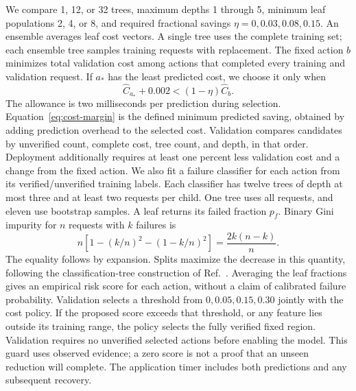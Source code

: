 We compare 1, 12, or 32 trees, maximum depths 1 through 5, minimum leaf populations 2, 4, or 8, and required fractional savings $\eta=0,0.03,0.08,0.15$. An ensemble averages leaf cost vectors. A single tree uses the complete training set; each ensemble tree samples training requests with replacement. The fixed action $b$ minimizes total validation cost among actions that completed every training and validation request. If $a_*$ has the least predicted cost, we choose it only when
\begin{equation}
 \widehat C_{a_*}+0.002 < (1-\eta)\widehat C_b.
 \label{eq:cost-margin}
\end{equation}
The allowance is two milliseconds per prediction during selection. Equation~\eqref{eq:cost-margin} is the defined minimum predicted saving, obtained by adding prediction overhead to the selected cost. Validation compares candidates by unverified count, complete cost, tree count, and depth, in that order. Deployment additionally requires at least one percent less validation cost and a change from the fixed action. We also fit a failure classifier for each action from its verified/unverified training labels. Each classifier has twelve trees of depth at most three and at least two requests per child. One tree uses all requests, and eleven use bootstrap samples. A leaf returns its failed fraction $p_f$. Binary Gini impurity for $n$ requests with $k$ failures is
\begin{equation}
 n\left[1-(k/n)^2-(1-k/n)^2\right]=\frac{2k(n-k)}{n}.
 \label{eq:failure-gini}
\end{equation}
The equality follows by expansion. Splits maximize the decrease in this quantity, following the classification-tree construction of Ref.~\cite{CART1984}. Averaging the leaf fractions gives an empirical risk score for each action, without a claim of calibrated failure probability. Validation selects a threshold from $0,0.05,0.15,0.30$ jointly with the cost policy. If the proposed score exceeds that threshold, or any feature lies outside its training range, the policy selects the fully verified fixed region. Validation requires no unverified selected actions before enabling the model. This guard uses observed evidence; a zero score is not a proof that an unseen reduction will complete. The application timer includes both predictions and any subsequent recovery.

